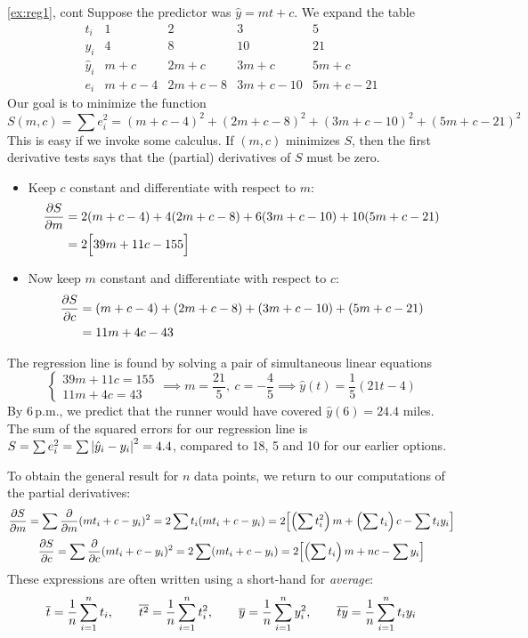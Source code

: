 \begin{example*}{\ref{ex:reg1}, cont}{}
	Suppose the predictor was $\hat y=mt+c$. We expand the table
	\[
		\begin{array}{c|ccccc}
			t_i&1&2&3&5\\\hline
			y_i&4&8&10&21\\\hline
		\hat y_i&m+c&2m+c&3m+c&5m+c\\\hline
		e_i&m+c-4&2m+c-8&3m+c-10&5m+c-21
		\end{array}
	\]
	Our goal is to minimize the function
	\[
		S(m,c) =\sum e_i^2= (m+c-4)^2 +(2m+c-8)^2 +(3m+c-10)^2 +(5m+c-21)^2
	\]
	This is easy if we invoke some calculus. If $(m,c)$ minimizes $S$, then the first derivative tests says that the (partial) derivatives of $S$ must be zero.
	\begin{itemize}
	  \item Keep $c$ constant and differentiate with respect to $m$:
	  \begin{align*}
			\partials[S]{m} &=2(m+c-4) +4(2m+c-8) +6(3m+c-10) +10(5m+c-21)\\*
			&=2\Bigl[39m+11c-155\Bigr]
		\end{align*}
		\item Now keep $m$ constant and differentiate with respect to $c$:
	  \begin{align*}
			\partials[S]{c} &=(m+c-4) +(2m+c-8) +(3m+c-10) +(5m+c-21)\\*
			&=11m+4c-43
		\end{align*}
	\end{itemize}
	The regression line is found by solving a pair of simultaneous linear equations
	\[
		\begin{cases}
			39m+11c=155\\
			11m+4c=43
		\end{cases}
		\implies 
	m=\frac{21}{5},\ c=-\frac{4}{5} \implies \hat y(t)=\frac 1{5}(21t-4)
	\]
	By 6\,p.m., we predict that the runner would have covered $\hat y(6)=24.4$ miles.\smallbreak
	The sum of the squared errors for our regression line is $S=\sum e_i^2=\sum\nm{\hat y_i-y_i}^2=4.4$, compared to 18, 5 and 10 for our earlier options.
\end{example*}


To obtain the general result for $n$ data points, we return to our computations of the partial derivatives:
\begin{gather*}
	\partials[S]{m}=\sum\partials{m}(mt_i+c-y_i)^2 =2\sum t_i(mt_i+c-y_i) =2\Bigl[\left(\sum t_i^2\right)m+\left(\sum t_i\right)c-\sum t_iy_i\Bigr]\\[3pt]
	\partials[S]{c}=\sum\partials{c}(mt_i+c-y_i)^2 =2\sum (mt_i+c-y_i) =2\Bigl[\left(\sum t_i\right)m+nc-\sum y_i\Bigr]
\end{gather*}
These expressions are often written using a short-hand for \emph{average}:
\[
	\cl t=\frac 1n\sum_{i=1}^nt_i,\qquad \cl{t^2}=\frac 1n\sum_{i=1}^nt_i^2,\qquad \cl{y}=\frac 1n\sum_{i=1}^ny_i^2,\qquad \cl{ty}=\frac 1n\sum_{i=1}^nt_iy_i
\]


